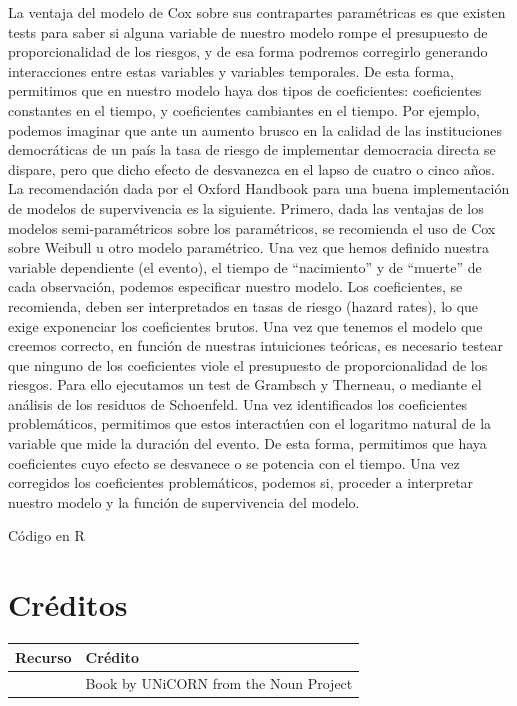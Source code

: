 \documentclass[]{book}
\begin{document}
La ventaja del modelo de Cox sobre sus contrapartes paramétricas es que
existen tests para saber si alguna variable de nuestro modelo rompe el
presupuesto de proporcionalidad de los riesgos, y de esa forma podremos
corregirlo generando interacciones entre estas variables y variables
temporales. De esta forma, permitimos que en nuestro modelo haya dos
tipos de coeficientes: coeficientes constantes en el tiempo, y
coeficientes cambiantes en el tiempo. Por ejemplo, podemos imaginar que
ante un aumento brusco en la calidad de las instituciones democráticas
de un país la tasa de riesgo de implementar democracia directa se
dispare, pero que dicho efecto de desvanezca en el lapso de cuatro o
cinco años. La recomendación dada por el Oxford Handbook para una buena
implementación de modelos de supervivencia es la siguiente. Primero,
dada las ventajas de los modelos semi-paramétricos sobre los
paramétricos, se recomienda el uso de Cox sobre Weibull u otro modelo
paramétrico. Una vez que hemos definido nuestra variable dependiente (el
evento), el tiempo de ``nacimiento'' y de ``muerte'' de cada
observación, podemos especificar nuestro modelo. Los coeficientes, se
recomienda, deben ser interpretados en tasas de riesgo (hazard rates),
lo que exige exponenciar los coeficientes brutos. Una vez que tenemos el
modelo que creemos correcto, en función de nuestras intuiciones
teóricas, es necesario testear que ninguno de los coeficientes viole el
presupuesto de proporcionalidad de los riesgos. Para ello ejecutamos un
test de Grambsch y Therneau, o mediante el análisis de los residuos de
Schoenfeld. Una vez identificados los coeficientes problemáticos,
permitimos que estos interactúen con el logaritmo natural de la variable
que mide la duración del evento. De esta forma, permitimos que haya
coeficientes cuyo efecto se desvanece o se potencia con el tiempo. Una
vez corregidos los coeficientes problemáticos, podemos si, proceder a
interpretar nuestro modelo y la función de supervivencia del modelo.

Código en R

\hypertarget{creditos}{%
\chapter*{Créditos}\label{creditos}}

\begin{longtable}[]{@{}cl@{}}
\toprule
Recurso & Crédito\tabularnewline
\midrule
\endhead
& Book by UNiCORN from the Noun Project\tabularnewline
\bottomrule
\end{longtable}


\end{document}
